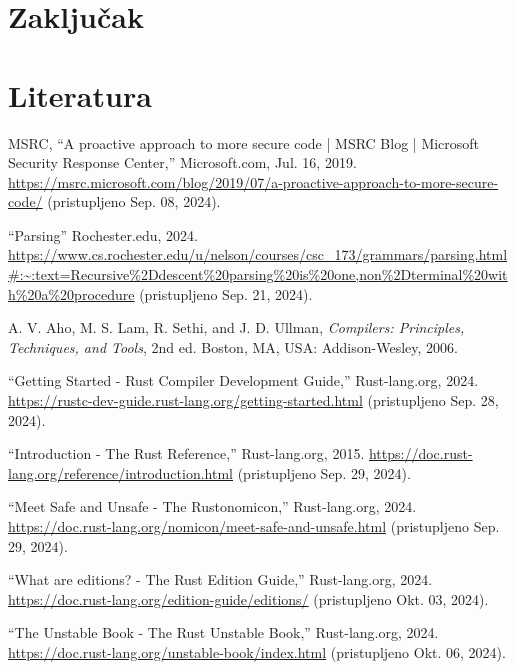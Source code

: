 \documentclass[11pt]{article}
\begin{document}

\newpage
\section{Zaključak}

\newpage
\section{Literatura}

\begin{thebibliography}
    \raggedright
{} 
    MSRC, “A proactive approach to more secure code | MSRC Blog | 
    Microsoft Security Response Center,” Microsoft.com, Jul. 16, 2019. 
    \url{https://msrc.microsoft.com/blog/2019/07/a-proactive-approach-to-more-secure-code/} 
    (pristupljeno Sep. 08, 2024).

    “Parsing” Rochester.edu, 2024.
    \url{https://www.cs.rochester.edu/u/nelson/courses/csc_173/grammars/parsing.html#:~:text=Recursive%2Ddescent%20parsing%20is%20one,non%2Dterminal%20with%20a%20procedure} 
    (pristupljeno Sep. 21, 2024).

    A. V. Aho, M. S. Lam, R. Sethi, and J. D. Ullman, \emph{Compilers: Principles, Techniques, and Tools}, 2nd ed. Boston, MA, USA: Addison-Wesley, 2006.

    “Getting Started - Rust Compiler Development Guide,” Rust-lang.org, 2024. 
    \url{https://rustc-dev-guide.rust-lang.org/getting-started.html} (pristupljeno Sep. 28, 2024).

    “Introduction - The Rust Reference,” Rust-lang.org, 2015. 
    \url{https://doc.rust-lang.org/reference/introduction.html} (pristupljeno Sep. 29, 2024).
    
    “Meet Safe and Unsafe - The Rustonomicon,” Rust-lang.org, 2024. 
    \url{https://doc.rust-lang.org/nomicon/meet-safe-and-unsafe.html} (pristupljeno Sep. 29, 2024).

    “What are editions? - The Rust Edition Guide,” Rust-lang.org, 2024.
    \url{https://doc.rust-lang.org/edition-guide/editions/} (pristupljeno Okt. 03, 2024).

    “The Unstable Book - The Rust Unstable Book,” Rust-lang.org, 2024. 
    \url{https://doc.rust-lang.org/unstable-book/index.html} (pristupljeno Okt. 06, 2024).


\end{thebibliography}
\end{document}
